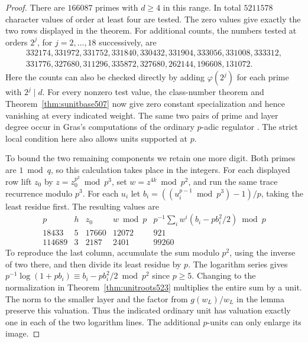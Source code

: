 \documentclass[a4paper,11pt]{article}
\theoremstyle{definition}
\theoremstyle{remark}
\numberwithin{equation}{section}
\begin{document}
\begin{proof}
There are \(166087\) primes with \(d\ge4\) in this range. In total
\(5211578\) character values of order at least four are tested. The
zero values give exactly the two rows displayed in the theorem. For
additional counts, the numbers tested at orders \(2^j\), for
\(j=2,\ldots,18\) successively, are
\[
 \begin{gathered}
 332174,331972,331752,331840,330432,331904,333056,331008,333312,\\
 331776,327680,311296,335872,327680,262144,196608,131072 .
 \end{gathered}
\]
Here the counts can also be checked directly by adding
\(\varphi(2^j)\) for each prime with \(2^j\mid d\).
For every nonzero test value, the class-number theorem and
Theorem~\ref{thm:sunitbase507} now give zero constant specialization
and hence vanishing at every indicated weight. The same two pairs
of prime and layer degree occur in Gras's computations of the
ordinary \(p\)-adic regulator \cite{XI-VIII-grasdyadic525}. The strict local
condition here also allows units supported at \(p\).

To bound the two remaining components we retain one more digit. Both
primes are \(1\bmod q\), so this calculation takes place in the
integers. For each displayed row lift \(z_0\) by \(z=z_0^{p^2}\bmod
p^3\), set \(w=z^{4k}\bmod p^2\), and run the same trace recurrence
modulo \(p^3\). For each \(u_i\) let
\(b_i=((u_i^{p-1}\bmod p^3)-1)/p\), taking the least residue first.
The resulting values are
\[
\begin{array}{r|rrrr}
 p&h& z_0 & w\bmod p &
 p^{-1}\sum_i w^i(b_i-p b_i^2/2)\bmod p\\ \hline
 18433&5&17660&12072&921\\
 114689&3&2187&2401&99260
\end{array}
\]
To reproduce the last column, accumulate the sum modulo \(p^2\),
using the inverse of two there, and then divide its least residue
by \(p\). The logarithm series gives
\(p^{-1}\log(1+p b_i)\equiv b_i-p b_i^2/2\bmod p^2\) since \(p\ge5\).
Changing to the normalization in Theorem~\ref{thm:unitroots523}
multiplies the entire sum by a unit. The norm to the smaller layer
and the factor from \(g(w_L)/w_L\) in the lemma preserve this
valuation. Thus the indicated ordinary unit has valuation exactly
one in each of the two logarithm lines. The additional \(p\)-units
can only enlarge its image.


\end{proof}
\end{document}
